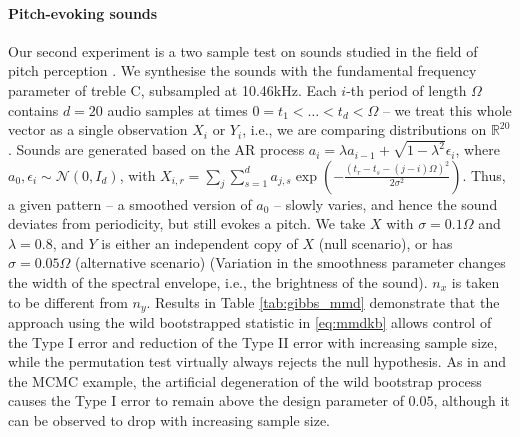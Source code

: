 \paragraph{Pitch-evoking sounds}
Our second experiment  is a two sample test on sounds studied in the field of pitch perception \cite{hehrmannthesis}. We synthesise the sounds with the fundamental frequency
parameter of treble C, subsampled at 10.46kHz. Each $i$-th period
of length $\Omega$ contains $d=20$ audio samples at times $0=t_{1}<\ldots<t_{d}<\Omega$
-- we treat this whole vector as a single observation $X_{i}$ or
$Y_{i}$, i.e., we are comparing distributions on $\mathbb{R}^{20}$.
Sounds are generated based on the AR process $a_{i}=\lambda a_{i-1}+\sqrt{1-\lambda^{2}}\epsilon_{i}$,
where $a_{0},\epsilon_{i}\sim\mathcal{N}(0,I_{d})$, with $X_{i,r}=\sum_{j}\sum_{s=1}^{d}a_{j,s}\exp\left(-\frac{\left(t_{r}-t_{s}-(j-i)\Omega\right)^{2}}{2\sigma^{2}}\right)$.
Thus, a given pattern -- a smoothed version of $a_{0}$ -- slowly
varies, and hence the sound deviates from
periodicity, but still evokes a pitch. We take
$X$ with $\sigma=0.1\Omega$
and $\lambda=0.8$, and $Y$ is either an independent copy of $X$
(null scenario), or has $\sigma=0.05\Omega$ (alternative scenario)
(Variation in the smoothness parameter changes the width of the
spectral envelope, i.e., the brightness of the sound). $n_x$ is taken to be different from $n_y$. Results in Table \ref{tab:gibbs_mmd} demonstrate that the
approach using the wild bootstrapped statistic in \eqref{eq:mmdkb} allows control of the Type I error and reduction of the Type II error with increasing sample size, while the permutation test
virtually always rejects the null hypothesis.
As in \cite{leucht_dependent_2013} and the MCMC example, the artificial degeneration of the wild bootstrap process causes the Type I error to remain above the design parameter of $0.05$, although it can be observed to drop with increasing sample size.

% 



